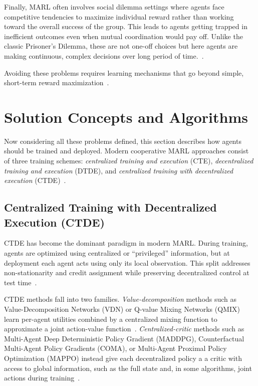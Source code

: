 Finally, MARL often involves social dilemma settings where agents face competitive tendencies to maximize individual reward rather than working toward the overall success of the group. This leads to agents getting trapped in inefficient outcomes even when mutual coordination would pay off. Unlike the classic Prisoner's Dilemma, these are not one-off choices but here agents are making continuous, complex decisions over long period of time.~\cite{leibo2017ssd}.

Avoiding these problems requires learning mechanisms that go beyond simple, short-term reward maximization~\cite{albrecht2024marl}.

\section{Solution Concepts and Algorithms}
Now considering all these problems defined, this section describes how agents should be trained and deployed. Modern cooperative MARL approaches consist of three training schemes: \emph{centralized training and execution} (CTE), \emph{decentralized training and execution} (DTDE), and \emph{centralized training with decentralized execution} (CTDE)~\cite{albrecht2024marl}. 

\subsection{Centralized Training with Decentralized Execution (CTDE)}
\label{ctde}

CTDE has become the dominant paradigm in modern MARL. During training, agents are optimized using centralized or ``privileged'' information, but at deployment each agent acts using only its local observation. This split addresses non-stationarity and credit assignment while preserving decentralized control at test time~\cite{albrecht2024marl}.

CTDE methods fall into two families. \emph{Value-decomposition} methods such as Value-Decomposition Networks (VDN) or Q-value Mixing Networks (QMIX) learn per-agent utilities combined by a centralized mixing function to approximate a joint action-value function~\cite{sunehag2018vdn,rashid2018qmix}.
\emph{Centralized-critic} methods such as Multi-Agent Deep Deterministic Policy Gradient (MADDPG),
Counterfactual Multi-Agent Policy Gradients (COMA), or Multi-Agent Proximal Policy Optimization (MAPPO)
instead give each decentralized policy a a critic with access to global information, such as the full state and, in some algorithms, joint actions during
training~\cite{lowe2017maddpg,foerster2018coma,yu2021mappo}.



